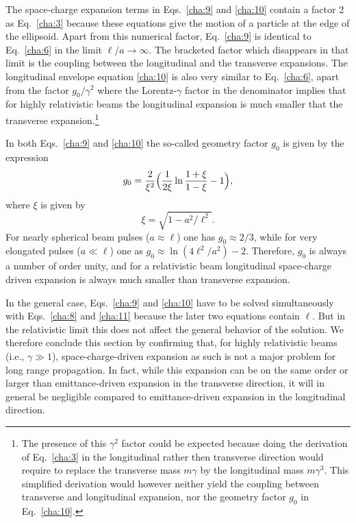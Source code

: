 \documentclass [12pt,a4paper,     ]{report} %
\begin{document}
   The space-charge expansion terms in Eqs.~\eqref{cha:9} and \eqref{cha:10} contain a factor 2 as Eq.~\eqref{cha:3} because these equations give the motion of a particle at the edge of the ellipsoid.  Apart from this numerical factor, Eq.~\eqref{cha:9} is identical to Eq.~\eqref{cha:6} in the limit $\ell/a \rightarrow \infty$.  The bracketed factor which disappears in that limit is the coupling between the longitudinal and the transverse expansions.  The longitudinal envelope equation \eqref{cha:10} is also very similar to Eq.~\eqref{cha:6}, apart from the factor ${g_0}/{\gamma^2}$ where the Lorentz-$\gamma$ factor in the denominator implies that for highly relativistic beams the longitudinal expansion is much smaller that the transverse expansion.\footnote{The presence of this $\gamma^2$ factor could be expected because doing the derivation of Eq.~\eqref{cha:3} in the longitudinal rather then transverse direction would require to replace the transverse mass $m\gamma$ by the longitudinal mass $m\gamma^3$.  This simplified derivation would however neither yield the coupling between transverse and longitudinal expansion, nor the geometry factor $g_0$ in Eq.~\eqref{cha:10}.} 
 
  In both Eqs.~\eqref{cha:9} and \eqref{cha:10} the so-called geometry factor $g_0$ is given by the expression  \cite[p.405]{REISE1994-}
%
\begin{equation}\label{cha:11} %
      g_0 = \frac{2}{\xi^2}
                \Bigl(\frac{1}{2\xi} \ln \frac{1+\xi}{1-\xi} - 1 \Bigr),
\end{equation}
%
where $\xi$ is given by
%
\begin{equation}\label{cha:12} %
      \xi = \sqrt{ 1 - {a^2}/{\ell^2}}.
\end{equation}
%
For nearly spherical beam pulses ($a \approx \ell$) one has $g_0  \approx 2/3$, while for very elongated pulses ($a \ll \ell$) one as
$g_0 \approx \ln (4{\ell^2}/{a^2}) - 2$. Therefore, $g_0$ is always a number of order unity, and for a relativistic beam longitudinal space-charge driven expansion is always much smaller than transverse expansion.

  In the general case, Eqs.~\eqref{cha:9} and \eqref{cha:10} have to be solved simultaneously with Eqs.~\eqref{cha:8} and \eqref{cha:11} because the later two equations contain $\ell$.  But in the relativistic limit this does not affect the general behavior of the solution.  We therefore conclude this section by confirming that, for highly relativistic beams (i.e., $\gamma \gg 1$), space-charge-driven expansion as such is not a major problem for long range propagation.  In fact, while this expansion can be on the same order or larger than emittance-driven expansion in the transverse direction, it will in general be negligible compared to emittance-driven expansion in the longitudinal direction.
\end{document}

